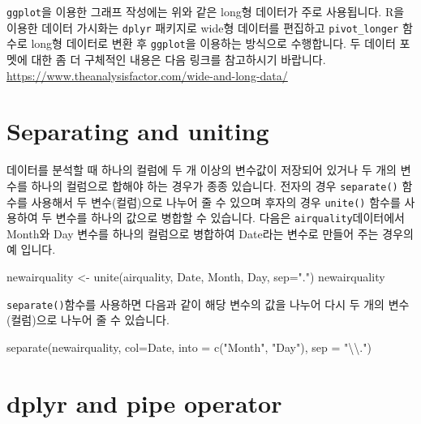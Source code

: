 \documentclass[
]{book}
\newenvironment{Shaded}{\begin{snugshade}}{\end{snugshade}}
\newcommand{\AttributeTok}[1]{\textcolor[rgb]{0.77,0.63,0.00}{#1}}
\newcommand{\FunctionTok}[1]{\textcolor[rgb]{0.00,0.00,0.00}{#1}}
\newcommand{\NormalTok}[1]{#1}
\newcommand{\OtherTok}[1]{\textcolor[rgb]{0.56,0.35,0.01}{#1}}
\newcommand{\SpecialCharTok}[1]{\textcolor[rgb]{0.00,0.00,0.00}{#1}}
\newcommand{\StringTok}[1]{\textcolor[rgb]{0.31,0.60,0.02}{#1}}
\begin{document}
\texttt{ggplot}을 이용한 그래프 작성에는 위와 같은 long형 데이터가 주로 사용됩니다. R을 이용한 데이터 가시화는 \texttt{dplyr} 패키지로 wide형 데이터를 편집하고 \texttt{pivot\_longer} 함수로 long형 데이터로 변환 후 \texttt{ggplot}을 이용하는 방식으로 수행합니다. 두 데이터 포멧에 대한 좀 더 구체적인 내용은 다음 링크를 참고하시기 바랍니다. \url{https://www.theanalysisfactor.com/wide-and-long-data/}

\hypertarget{separating-and-uniting}{%
\section{Separating and uniting}\label{separating-and-uniting}}

데이터를 분석할 때 하나의 컬럼에 두 개 이상의 변수값이 저장되어 있거나 두 개의 변수를 하나의 컬럼으로 합해야 하는 경우가 종종 있습니다. 전자의 경우 \texttt{separate()} 함수를 사용해서 두 변수(컬럼)으로 나누어 줄 수 있으며 후자의 경우 \texttt{unite()} 함수를 사용하여 두 변수를 하나의 값으로 병합할 수 있습니다. 다음은 \texttt{airquality}데이터에서 Month와 Day 변수를 하나의 컬럼으로 병합하여 Date라는 변수로 만들어 주는 경우의 예 입니다.

\begin{Shaded}
\begin{Highlighting}[]
\NormalTok{newairquality }\OtherTok{\textless{}{-}} \FunctionTok{unite}\NormalTok{(airquality, Date, Month, Day, }\AttributeTok{sep=}\StringTok{"."}\NormalTok{)}
\NormalTok{newairquality}
\end{Highlighting}
\end{Shaded}

\texttt{separate()}함수를 사용하면 다음과 같이 해당 변수의 값을 나누어 다시 두 개의 변수(컬럼)으로 나누어 줄 수 있습니다.

\begin{Shaded}
\begin{Highlighting}[]
\FunctionTok{separate}\NormalTok{(newairquality, }\AttributeTok{col=}\NormalTok{Date, }\AttributeTok{into =} \FunctionTok{c}\NormalTok{(}\StringTok{"Month"}\NormalTok{, }\StringTok{"Day"}\NormalTok{), }\AttributeTok{sep =} \StringTok{"}\SpecialCharTok{\textbackslash{}\textbackslash{}}\StringTok{."}\NormalTok{)}
\end{Highlighting}
\end{Shaded}

\hypertarget{dplyr-and-pipe-operator}{%
\section{dplyr and pipe operator}\label{dplyr-and-pipe-operator}}
\end{document}
